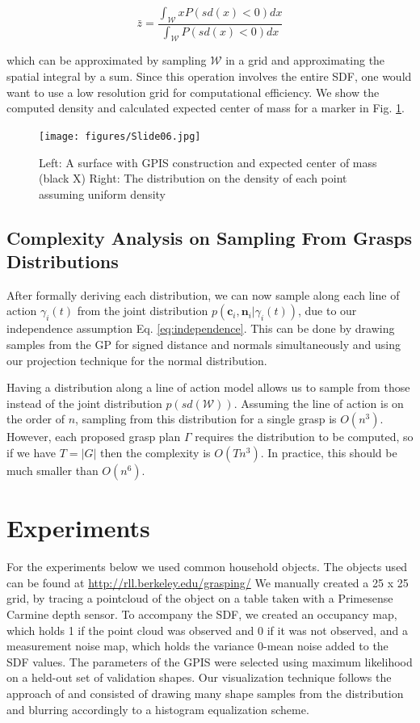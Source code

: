 \documentclass[letterpaper, 10 pt, conference]{ieeeconf}  %
\begin{document}
\begin{equation}
  \bar{z} 
  =
  \frac
    {\int_{\mathcal{W}}x P(sd(x)<0) dx}
    {\int_{\mathcal{W}}  P(sd(x)<0) dx}
\end{equation}

which can be approximated by sampling $\mathcal{W}$ in a grid and approximating the spatial integral by a sum. Since this operation involves the entire SDF, one would want to use a low resolution grid for computational efficiency. We show the computed density and calculated expected center of mass for a marker in Fig. \ref{fig:GPIS_MASS}.


\begin{figure}[ht!]
\centering
\texttt{[image: figures/Slide06.jpg]}
\caption{ \footnotesize Left: A surface with GPIS construction and expected center of mass (black X)
Right: The distribution on the density of each point assuming uniform density}
\vspace*{-10pt}
\label{fig:GPIS_MASS}
\end{figure}

\subsection{Complexity Analysis on Sampling From Grasps Distributions}

After formally deriving each distribution,  we can now sample along each line of action $\gamma_i(t)$ from the joint distribution $p(\textbf{c}_i,\textbf{n}_i | \gamma_i(t))$, due to our independence assumption Eq. \ref{eq:independence}. This can be done by drawing samples from the GP for signed distance and normals simultaneously and using our projection technique for the normal distribution. 

Having a distribution along a line of action model allows us to sample from those instead of the joint distribution $p(sd(\mathcal{W}))$. Assuming the line of action is on the order of $n$, sampling from this distribution for a single grasp is $O(n^3)$. However, each proposed grasp plan $\Gamma$ requires the distribution to be computed, so if we have $T=|G|$ then the complexity is $O(Tn^3)$. In practice, this should be much smaller than $O(n^6)$. 




\section{Experiments}
For the experiments below we used common household objects.  The objects used can be found at \url{http://rll.berkeley.edu/grasping/} We manually created a 25 x 25 grid, by tracing a pointcloud of the object on a table taken with a Primesense Carmine depth sensor. To accompany the SDF, we created an occupancy map, which holds 1 if the point cloud was observed and 0 if it was not observed, and a measurement noise map, which holds the variance 0-mean noise added to the SDF values. The parameters of the GPIS were selected using maximum likelihood on a held-out set of validation shapes. Our visualization technique follows the approach of \cite{mahler2015opt} and consisted of drawing many shape samples from the distribution and blurring accordingly to a histogram equalization scheme. 
\end{document}
